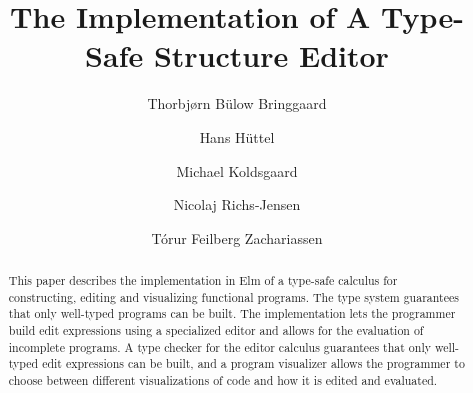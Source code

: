 \documentclass[sigplan,screen]{acmart}
\begin{document}

%
\title{The Implementation of A Type-Safe Structure Editor}
%
%


\author[Bringgaard]{Thorbjørn Bülow Bringgaard}


\author[Hüttel]{Hans Hüttel}


\author[Koldsgaard]{Michael Koldsgaard}

\author[Richs-Jensen]{Nicolaj Richs-Jensen}


\author[Zachariassen]{Tórur Feilberg Zachariassen}

  

%
%
%

%
 \begin{abstract}
   This paper describes the implementation in Elm of a
   type-safe calculus for constructing, editing and visualizing
   functional programs. The type system guarantees that only
   well-typed programs can be built. The implementation lets the
   programmer build edit expressions using a specialized editor and
   allows for the evaluation of incomplete programs. A type checker
   for the editor calculus guarantees that only well-typed edit
   expressions can be built, and a program visualizer allows the
   programmer to choose between different visualizations of code and
   how it is edited and evaluated.
\end{abstract}
\end{document}
